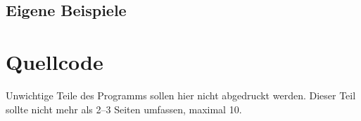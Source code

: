 \documentclass[a4paper,10pt,ngerman]{scrartcl}
\begin{document}
\subsection{Eigene Beispiele}

\section{Quellcode}
Unwichtige Teile des Programms sollen hier nicht abgedruckt werden. Dieser Teil sollte nicht mehr als 2–3 Seiten umfassen, maximal 10.
\end{document}

